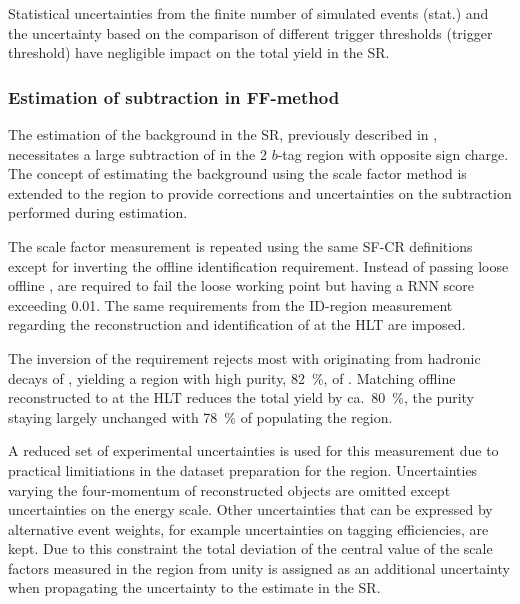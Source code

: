 Statistical uncertainties from the finite number of simulated events
(stat.) and the uncertainty based on the comparison of different
trigger thresholds (trigger threshold) have negligible impact on the
total yield in the \hadhad SR.





\subsubsection{Estimation of \ttbarFakes subtraction in FF-method}

The estimation of the \multijet background in the \hadhad SR,
previously described in , necessitates a
large subtraction of \ttbarFakes in the 2 $b$-tag \antiid region with
opposite sign \tauhadvis charge. The concept of estimating the
\ttbarFakes background using the scale factor method is extended to
the \antiid region to provide corrections and uncertainties on the
subtraction performed during \multijet estimation.

The scale factor measurement is repeated using the same SF-CR
definitions except for inverting the offline \tauhadvis identification
requirement. Instead of \tauhadvis passing loose offline \tauid,
\tauhadvis are required to fail the loose working point but having a
RNN \tauid score exceeding \num{0.01}. The same requirements from the
ID-region measurement regarding the reconstruction and identification
of \tauhadvis at the HLT are imposed.

The inversion of the \tauid requirement rejects most \ttbar with
\tauhadvis originating from hadronic decays of \tauleptons, yielding a
region with high purity, \SI{82}{\percent}, of \ttbarFakes. Matching
offline reconstructed \tauhadvis to \tauhadvis at the HLT reduces the
total \ttbarFakes yield by ca.\ \SI{80}{\percent}, the purity staying
largely unchanged with \SI{78}{\percent} of \ttbarFakes populating the
\antiid region.

A reduced set of experimental uncertainties is used for this
measurement due to practical limitiations in the dataset preparation
for the \lephad \antiid region. Uncertainties varying the
four-momentum of reconstructed objects are omitted except
uncertainties on the \tauhadvis energy scale. Other uncertainties that
can be expressed by alternative event weights, for example
uncertainties on tagging efficiencies, are kept. Due to this
constraint the total deviation of the central value of the scale
factors measured in the \antiid region from unity is assigned as an
additional uncertainty when propagating the uncertainty to the
\multijet estimate in the \hadhad SR.

